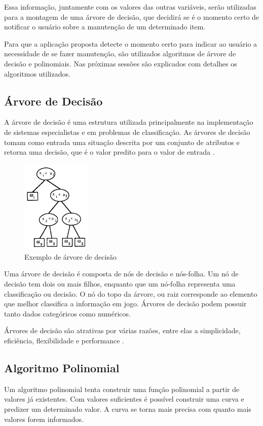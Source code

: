 \documentclass[12pt]{article}
\begin{document}
Essa informação, juntamente com os valores das outras variáveis, serão utilizadas
para a montagem de uma árvore de decisão, que decidirá se é o momento certo de
notificar o usuário sobre a manutenção de um determinado item.

Para que a aplicação proposta detecte o momento certo para indicar ao usuário a
necessidade de se fazer manutenção, são utilizados algoritmos de árvore de
decisão e polinomiais. Nas próximas sessões são explicados com detalhes os
algoritmos utilizados.

\subsection{Árvore de Decisão}\label{sec:arvorededecisao}
A árvore de decisão é uma estrutura utilizada principalmente na implementação de
sistemas especialistas e em problemas de classificação. As árvores de decisão
tomam como entrada uma situação descrita por um conjunto de atributos e retorna
uma decisão, que é o valor predito para o valor de entrada \cite{russell2003}.

\begin{figure}[h]
\centering
\includegraphics[width=0.3\textwidth]{arvorededecisao}
\caption{Exemplo de árvore de decisão \cite{safavian1991survey}}
\label{arvorededecisao}
\end{figure}

Uma árvore de decisão é composta de nós de decisão e nós-folha. Um nó de decisão
tem dois ou mais filhos, enquanto que um nó-folha representa uma classificação
ou decisão. O nó do topo da árvore, ou raiz corresponde ao elemento que melhor
classifica a informação em jogo. Árvores de decisão podem possuir tanto dados
categóricos como numéricos.

Árvores de decisão são atrativas por várias razões, entre elas a simplicidade,
eficiência, flexibilidade e performance \cite{safavian1991survey}.

\subsection{Algoritmo Polinomial}
Um algoritmo polinomial tenta construir uma função polinomial a partir de
valores já existentes. Com valores suficientes é possível construir uma curva
e predizer um determinado valor. A curva se torna mais precisa com quanto mais
valores forem informados.
\end{document}
